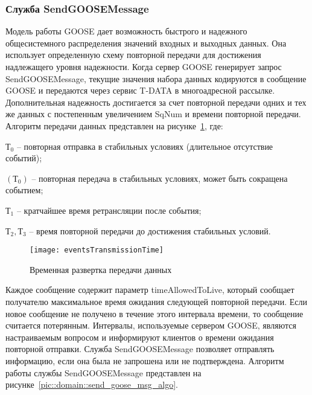 \fixTableSectionSpace

\subsubsection{Служба SendGOOSEMessage}

Модель работы GOOSE дает возможность быстрого и надежного общесистемного распределения
значений входных и выходных данных. Она использует определенную схему повторной
передачи для достижения надлежащего уровня надежности. Когда сервер GOOSE генерирует
запрос SendGOOSEMessage, текущие значения набора данных кодируются в сообщение
GOOSE и передаются через сервис T-DATA в многоадресной рассылке.
Дополнительная надежность достигается за счет повторной передачи одних
и тех же данных с постепенным увеличением SqNum и времени повторной передачи.
Алгоритм передачи данных представлен
на рисунке~\ref{pic::domain::events_transmission_time}, где:
\begin{explanationx}
    \item $ \text{Т}_0 $ -- повторная отправка в стабильных условиях (длительное отсутствие событий);
    \item $ (\text{Т}_0) $ -- повторная передача в стабильных условиях, может быть сокращена событием;
    \item $ \text{Т}_1 $ -- кратчайшее время ретрансляции после события;
    \item $ \text{Т}_2, \text{Т}_3 $ -- время повторной передачи до достижения стабильных условий.
\end{explanationx}

\begin{figure}[ht]
    \centering
    \texttt{[image: eventsTransmissionTime]}
    \caption{Временная развертка передачи данных}
    \label{pic::domain::events_transmission_time}
\end{figure}

Каждое сообщение содержит параметр timeAllowedToLive, который сообщает получателю
максимальное время ожидания следующей повторной передачи. Если новое сообщение
не получено в течение этого интервала времени, то сообщение считается потерянным.
Интервалы, используемые сервером GOOSE, являются настраиваемым вопросом и
информируют клиентов о времени ожидания повторной отправки. Служба SendGOOSEMessage
позволяет отправлять информацию, если она была не запрошена или не подтверждена.
Алгоритм работы службы SendGOOSEMessage представлен
на рисунке~\ref{pic::domain::send_goose_msg_algo}.

